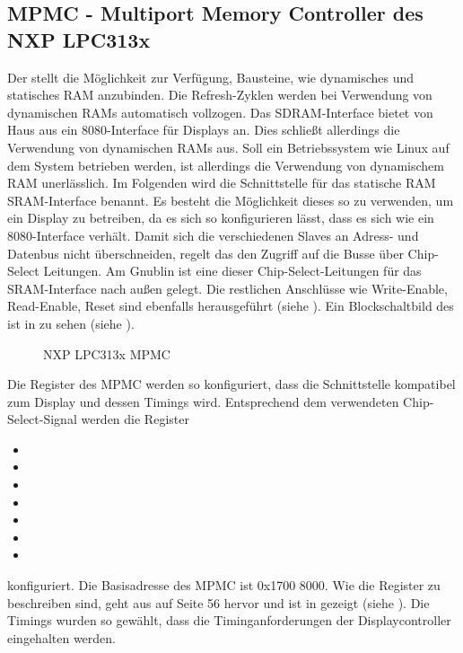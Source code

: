 \subsection{MPMC - Multiport Memory Controller des NXP LPC313x}
\label{cha:mpmc}

Der  stellt die Möglichkeit zur Verfügung, Bausteine, wie dynamisches und statisches RAM anzubinden. Die Refresh-Zyklen werden bei Verwendung von dynamischen RAMs automatisch vollzogen. Das SDRAM-Interface bietet von Haus aus ein 8080-Interface für Displays an. Dies schließt allerdings die Verwendung von dynamischen RAMs aus. Soll ein Betriebssystem wie Linux auf dem System betrieben werden, ist allerdings die Verwendung von dynamischem RAM unerlässlich. Im Folgenden wird die Schnittstelle für das statische RAM SRAM-Interface benannt. Es besteht die Möglichkeit dieses so zu verwenden, um ein Display zu betreiben, da es sich so konfigurieren lässt, dass es sich wie ein 8080-Interface verhält. Damit sich die verschiedenen Slaves an Adress- und Datenbus nicht überschneiden, regelt das  den Zugriff auf die Busse über Chip-Select Leitungen. Am Gnublin ist eine dieser Chip-Select-Leitungen für das SRAM-Interface nach außen gelegt. Die restlichen Anschlüsse wie Write-Enable, Read-Enable, Reset sind ebenfalls herausgeführt (siehe \cite{NXP2010}). Ein Blockschaltbild des  ist in  zu sehen (siehe \cite{NXP2010}).


\begin{figure}[tbph]
	\centering
{}
	\caption{NXP LPC313x MPMC}
	\label{fig:lpc_mpmc}
\end{figure}
\newpage
Die Register des MPMC werden so konfiguriert, dass die Schnittstelle kompatibel zum Display und dessen Timings wird. Entsprechend dem verwendeten Chip-Select-Signal werden die Register \begin{itemize}
\item {}
\item {}
\item  {}
\item  {}
\item  {}
\item  {}
\item {}
\end{itemize} konfiguriert. Die Basisadresse des MPMC ist 0x1700 8000. Wie die Register zu beschreiben sind, geht aus \cite{NXP2010} auf Seite 56 hervor und ist in  gezeigt (siehe \cite{NXP2010}). Die Timings wurden so gewählt, dass die Timinganforderungen der Displaycontroller eingehalten werden.

